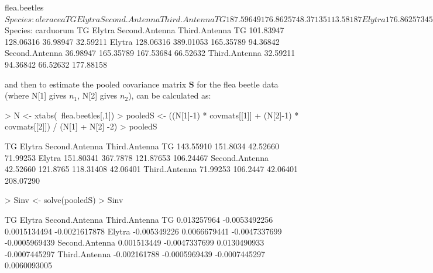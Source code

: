 \documentclass[11pt]{article}
\begin{document}
\begin{Schunk}
\begin{Soutput}
flea.beetles$Species: oleracea
                      TG    Elytra Second.Antenna Third.Antenna
TG             187.59649 176.86257       48.37135     113.58187
Elytra         176.86257 345.38596       75.97953     118.78070
Second.Antenna  48.37135  75.97953       66.35673      16.24269
Third.Antenna  113.58187 118.78070       16.24269     239.94152
------------------------------------------------------------ 
flea.beetles$Species: carduorum
                      TG    Elytra Second.Antenna Third.Antenna
TG             101.83947 128.06316       36.98947      32.59211
Elytra         128.06316 389.01053      165.35789      94.36842
Second.Antenna  36.98947 165.35789      167.53684      66.52632
Third.Antenna   32.59211  94.36842       66.52632     177.88158
\end{Soutput}
\end{Schunk}


and then to estimate the pooled covariance matrix $$ for the flea beetle data (where N[1] gives $n_{1}$,  N[2] gives $n_{2}$), can be calculated as:

\begin{Schunk}
\begin{Sinput}
> N <- xtabs(~flea.beetles[,1])
> pooledS <- ((N[1]-1) * covmats[[1]] + (N[2]-1) * covmats[[2]]) / (N[1] + N[2] -2)
> pooledS
\end{Sinput}
\begin{Soutput}
                      TG   Elytra Second.Antenna Third.Antenna
TG             143.55910 151.8034       42.52660      71.99253
Elytra         151.80341 367.7878      121.87653     106.24467
Second.Antenna  42.52660 121.8765      118.31408      42.06401
Third.Antenna   71.99253 106.2447       42.06401     208.07290
\end{Soutput}
\begin{Sinput}
> Sinv <- solve(pooledS)
> Sinv
\end{Sinput}
\begin{Soutput}
                         TG        Elytra Second.Antenna Third.Antenna
TG              0.013257964 -0.0053492256   0.0015134494 -0.0021617878
Elytra         -0.005349226  0.0066679441  -0.0047337699 -0.0005969439
Second.Antenna  0.001513449 -0.0047337699   0.0130490933 -0.0007445297
Third.Antenna  -0.002161788 -0.0005969439  -0.0007445297  0.0060093005
\end{Soutput}
\end{Schunk}
\end{document}
